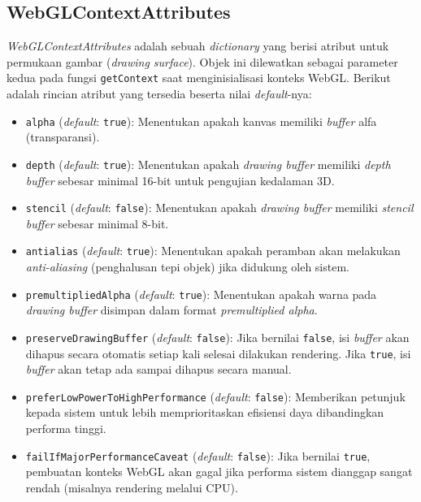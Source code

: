 \subsection{WebGLContextAttributes}
\label{subsec:WebGLContextAttributes}

\textit{WebGLContextAttributes} adalah sebuah \textit{dictionary} yang berisi atribut untuk permukaan gambar (\textit{drawing surface}). Objek ini dilewatkan sebagai parameter kedua pada fungsi \texttt{getContext} saat menginisialisasi konteks WebGL. Berikut adalah rincian atribut yang tersedia beserta nilai \textit{default}-nya:

\begin{itemize}
    \item \texttt{alpha} (\textit{default}: \texttt{true}): Menentukan apakah kanvas memiliki \textit{buffer} alfa (transparansi).
    \item \texttt{depth} (\textit{default}: \texttt{true}): Menentukan apakah \textit{drawing buffer} memiliki \textit{depth buffer} sebesar minimal 16-bit untuk pengujian kedalaman 3D.
    \item \texttt{stencil} (\textit{default}: \texttt{false}): Menentukan apakah \textit{drawing buffer} memiliki \textit{stencil buffer} sebesar minimal 8-bit.
    \item \texttt{antialias} (\textit{default}: \texttt{true}): Menentukan apakah peramban akan melakukan \textit{anti-aliasing} (penghalusan tepi objek) jika didukung oleh sistem.
    \item \texttt{premultipliedAlpha} (\textit{default}: \texttt{true}): Menentukan apakah warna pada \textit{drawing buffer} disimpan dalam format \textit{premultiplied alpha}.
    \item \texttt{preserveDrawingBuffer} (\textit{default}: \texttt{false}): Jika bernilai \texttt{false}, isi \textit{buffer} akan dihapus secara otomatis setiap kali selesai dilakukan rendering. Jika \texttt{true}, isi \textit{buffer} akan tetap ada sampai dihapus secara manual.
    \item \texttt{preferLowPowerToHighPerformance} (\textit{default}: \texttt{false}): Memberikan petunjuk kepada sistem untuk lebih memprioritaskan efisiensi daya dibandingkan performa tinggi.
    \item \texttt{failIfMajorPerformanceCaveat} (\textit{default}: \texttt{false}): Jika bernilai \texttt{true}, pembuatan konteks WebGL akan gagal jika performa sistem dianggap sangat rendah (misalnya rendering melalui CPU).
\end{itemize}

